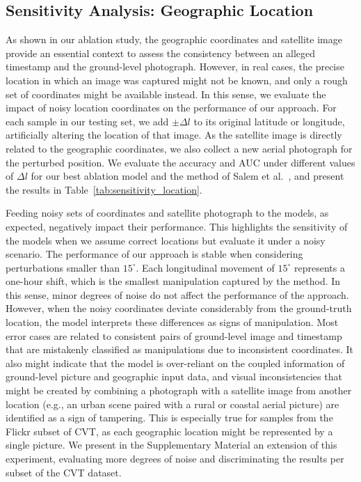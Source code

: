 \documentclass[journal]{IEEEtran}
\begin{document}
        
        
    \subsection{Sensitivity Analysis: Geographic Location}\label{sec:sensitivity_location}
        As shown in our ablation study, the geographic coordinates and satellite image provide an essential context to assess the consistency between an alleged timestamp and the ground-level photograph. However, in real cases, the precise location in which an image was captured might not be known, and only a rough set of coordinates might be available instead. In this sense, we evaluate the impact of noisy location coordinates on the performance of our approach. For each sample in our testing set, we add $\pm\Delta l$ to its original latitude or longitude, artificially altering the location of that image. As the satellite image is directly related to the geographic coordinates, we also collect a new aerial photograph for the perturbed position. We evaluate the accuracy and AUC under different values of $\Delta l$ for our best ablation model and the method of Salem et al.~\cite{salem2020learning}, and present the results in Table~\ref{tab:sensitivity_location}. 
        
        Feeding noisy sets of coordinates and satellite photograph to the models, as expected, negatively impact their performance. This highlights the sensitivity of the models when we assume correct locations but evaluate it under a noisy scenario. The performance of our approach is stable when considering perturbations smaller than $15^{\circ}$. Each longitudinal movement of $15^{\circ}$ represents a one-hour shift, which is the smallest manipulation captured by the method. In this sense, minor degrees of noise do not affect the performance of the approach. However, when the noisy coordinates deviate considerably from the ground-truth location, the model interprets these differences as signs of manipulation. Most error cases are related to consistent pairs of ground-level image and timestamp that are mistakenly classified as manipulations due to inconsistent coordinates. It also might indicate that the model is over-reliant on the coupled information of ground-level picture and geographic input data, and visual inconsistencies that might be created by combining a photograph with a satellite image from another location (e.g., an urban scene paired with a rural or coastal aerial picture) are identified as a sign of tampering. This is especially true for samples from the Flickr subset of CVT, as each geographic location might be represented by a single picture. We present in the Supplementary Material an extension of this experiment, evaluating more degrees of noise and discriminating the results per subset of the CVT dataset.
        
\end{document}
